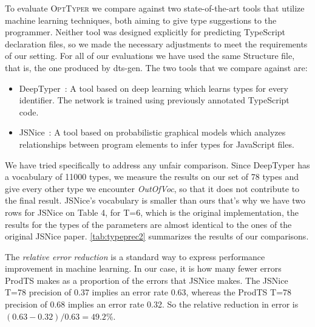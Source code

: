 \documentclass[sigplan,10pt,review,anonymous]{acmart} %
\newcommand{\projectname}{\textsc{OptTyper}\xspace}
\theoremstyle{plain}
\theoremstyle{remark}
\theoremstyle{definition}
\begin{document}
To evaluate \projectname we compare against two state-of-the-art tools that utilize machine learning techniques,
both aiming to give type suggestions to the programmer.
Neither tool was designed explicitly for predicting TypeScript declaration files,
so we made the necessary adjustments to meet the requirements of our setting.
For all of our evaluations we have used the same Structure file, that is, the one produced by dts-gen.
The two tools that we compare against are:
\begin{itemize}[label={\tiny$\bullet$}]
	\item DeepTyper~\cite{hellendoorn18}: A tool based on deep learning which learns types for every identifier.
	      The network is trained using previously annotated TypeScript code.
	\item JSNice~\cite{raychev15}: A tool based on probabilistic graphical models which analyzes relationships
	      between program elements to infer types for JavaScript files.
\end{itemize}

We have tried specifically to address any unfair comparison.
Since DeepTyper has a vocabulary of 11000 types, we measure the results on our set of 78 types
and give every other type we encounter \textit{OutOfVoc}, so that it does not contribute to the final result.
JSNice's vocabulary is smaller than ours that's why we have two rows for JSNice on Table 4, for T=6,
which is the original implementation,
the results for the types of the parameters are almost identical to the ones of the original JSNice paper.
\cref{tab:typeprec2} summarizes the results of our comparisons.

The \emph{relative error reduction} is a standard way to express performance improvement in machine learning.
In our case, it is how many fewer errors ProdTS makes as a proportion of the errors that JSNice makes.
The JSNice T=78 precision of 0.37 implies an error rate 0.63,
whereas the ProdTS T=78 precision of 0.68 implies an error rate 0.32.
So the relative reduction in error is $(0.63-0.32) / 0.63 = 49.2\%$.
\end{document}
